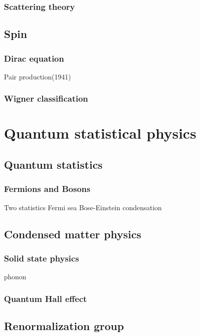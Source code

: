 \documentclass{../note}
\begin{document}
\section{Scattering theory}

\chapter{Spin}
\section{}
\section{Dirac equation}
Pair production(1941)
\section{Wigner classification}






\part{Quantum statistical physics}

\chapter{Quantum statistics}
\section{Fermions and Bosons}
Two statistics
Fermi sea
Bose-Einstein condensation

\chapter{Condensed matter physics}
\section{Solid state physics}
phonon
\section{Quantum Hall effect}


\chapter{Renormalization group}
\end{document}

